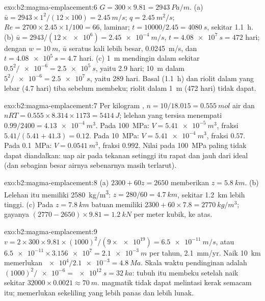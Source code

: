 \begin{solution}{exo:b2:magma-emplacement:6}
$G = 300\times9.81 = \qty{2943}{Pa/m}$. (a) $\bar u = 2943\times1^2/(12\times100) =
\qty{2.45}{m/s}$; $q = \qty{2.45}{m^2/s}$; $Re = 2700\times2.45\times1/100 = 66$, laminar;
$t = 10000/2.45 = \qty{4080}{s}$, sekitar \qty{1.1}{h}. (b) $\bar u =
2943/(12\times\num{e6}) = \qty{2.45e-4}{m/s}$, $t = \qty{4.08e7}{s} = 472$ hari; dengan
$w = \qty{10}{m}$, $\bar u$ seratus kali lebih besar, \qty{0.0245}{m/s}, dan $t =
\qty{4.08e5}{s} = 4.7$ hari. (c)  \qty{1}{m} mendingin dalam sekitar
$0.5^2/\num{e-6} = \qty{2.5e5}{s}$, yaitu 2.9 hari;  \qty{10}{m} dalam $5^2/\num{e-6} =
\qty{2.5e7}{s}$, yaitu 289 hari. Basal (\qty{1.1}{h}) dan riolit dalam 
yang lebar (4.7 hari) tiba sebelum  membeku; riolit dalam
 \qty{1}{m} (472 hari) tidak dapat.
\end{solution}

\begin{solution}{exo:b2:magma-emplacement:7}
Per kilogram , $n = 10/18.015 = \qty{0.555}{mol}$ air dan $nRT =
0.555\times8.314\times1173 = \qty{5414}{J}$; lelehan yang tersisa menempati $0.99/2400 =
\qty{4.13e-4}{m^3}$. Pada \qty{100}{MPa}: $V = \qty{5.41e-5}{m^3}$, fraksi
$5.41/(5.41 + 41.3) = 0.12$. Pada \qty{10}{MPa}: $V = \qty{5.41e-4}{m^3}$, fraksi
$0.57$. Pada \qty{0.1}{MPa}: $V = \qty{0.0541}{m^3}$, fraksi $0.992$. Nilai pada
\qty{100}{MPa} paling tidak dapat diandalkan: uap air pada tekanan setinggi itu rapat dan
jauh dari ideal (dan sebagian besar airnya sebenarnya masih terlarut).
\end{solution}

\begin{solution}{exo:b2:magma-emplacement:8}
(a) $2300 + 60z = 2650$ memberikan $z = \qty{5.8}{km}$. (b) Lelehan itu memiliki
\qty{2580}{kg/m^3}: $z = 280/60 = \qty{4.7}{km}$, sekitar \qty{1.2}{km} lebih tinggi. (c)
Pada $z = \qty{7.8}{km}$ batuan memiliki $2300 + 60\times7.8 = \qty{2770}{kg/m^3}$;
gayanya $(2770 - 2650)\times9.81 = \qty{1.2}{kN}$ per meter kubik, ke atas.
\end{solution}

\begin{solution}{exo:b2:magma-emplacement:9}
$v = 2\times300\times9.81\times(1000)^2/(9\times\num{e19}) = \qty{6.5e-11}{m/s}$, atau
$\num{6.5e-11}\times\num{3.156e7} = \qty{2.1e-3}{m}$ per tahun, \qty{2.1}{mm/yr}. Naik
\qty{10}{km} memerlukan $\num{e4}/\num{2.1e-3} = \qty{4.8}{Ma}$. Skala waktu pendinginan
adalah $(1000)^2/\num{e-6} = \qty{e12}{s} = \qty{32}{ka}$: tubuh itu membeku setelah
naik sekitar $32000\times0.0021 \approx \qty{70}{m}$.  magmatik tidak dapat melintasi
kerak semacam itu;  memerlukan sekeliling yang lebih panas dan lebih lunak.
\end{solution}

